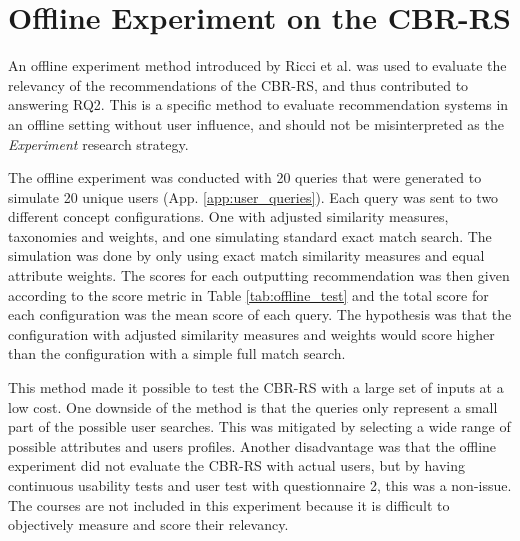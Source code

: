 \section{Offline Experiment on the CBR-RS}\label{sec:observation_test}

An offline experiment method introduced by Ricci et al. \cite{ricci2011introduction} was used to evaluate the relevancy of the recommendations of the CBR-RS, and thus contributed to answering RQ2. This is a specific method to evaluate recommendation systems in an offline setting without user influence, and should not be misinterpreted as the \textit{Experiment} research strategy.

The offline experiment was conducted with 20 queries that were generated to simulate 20 unique users (App. \ref{app:user_queries}). Each query was sent to two different concept configurations. One with adjusted similarity measures, taxonomies and weights, and one simulating standard exact match search. The simulation was done by only using exact match similarity measures and equal attribute weights. The scores for each outputting recommendation was then given according to the score metric in Table \ref{tab:offline_test} and the total score for each configuration was the mean score of each query. The hypothesis was that the configuration with adjusted similarity measures and weights would score higher than the configuration with a simple full match search. 

This method made it possible to test the CBR-RS with a large set of inputs at a low cost. One downside of the method is that the queries only represent a small part of the possible user searches. This was mitigated by selecting a wide range of possible attributes and users profiles. Another disadvantage was that the offline experiment did not evaluate the CBR-RS with actual users, but by having continuous usability tests and user test with questionnaire 2, this was a non-issue. The courses are not included in this experiment because it is difficult to objectively measure and score their relevancy.


